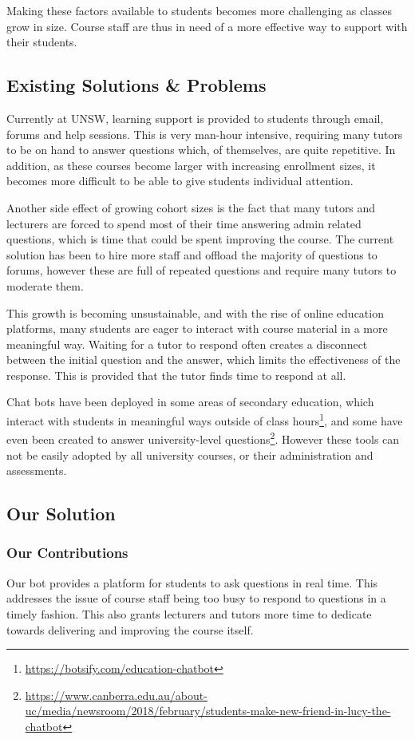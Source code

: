 Making these factors available to students becomes more challenging as classes grow in size. Course staff are thus in need of a more effective way to support with their students. 

\subsection{Existing Solutions \& Problems}
Currently at UNSW, learning support is provided to students through email, forums and help sessions. This is very man-hour intensive, requiring many tutors to be on hand to answer questions which, of themselves, are quite repetitive. In addition, as these courses become larger with increasing enrollment sizes, it becomes more difficult to be able to give students individual attention.

Another side effect of growing cohort sizes is the fact that many tutors and lecturers are forced to spend most of their time answering admin related questions, which is time that could be spent improving the course. The current solution has been to hire more staff and offload the majority of questions to forums, however these are full of repeated questions and require many tutors to moderate them.

This growth is becoming unsustainable, and with the rise of online education platforms, many students are eager to interact with course material in a more meaningful way. Waiting for a tutor to respond often creates a disconnect between the initial question and the answer, which limits the effectiveness of the response. This is provided that the tutor finds time to respond at all.

Chat bots have been deployed in some areas of secondary education, which interact with students in meaningful ways outside of class hours\footnote{\url{https://botsify.com/education-chatbot}}, and some have even been created to answer university-level questions\footnote{\url{https://www.canberra.edu.au/about-uc/media/newsroom/2018/february/students-make-new-friend-in-lucy-the-chatbot}}. However these tools can not be easily adopted by all university courses, or their administration and assessments.

\subsection{Our Solution}
\subsubsection{Our Contributions}
Our bot provides a platform for students to ask questions in real time. This addresses the issue of course staff being too busy to respond to questions in a timely fashion. This also grants lecturers and tutors more time to dedicate towards delivering and improving the course itself.

